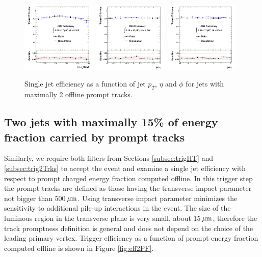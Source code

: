  
\begin{figure}[!h]
\centering
 \includegraphics[width=0.32\textwidth]{plots/trigger/effHT300_2Trk_Pt.pdf}
 \includegraphics[width=0.32\textwidth]{plots/trigger/effHT300_2Trk_Eta.pdf}
 \includegraphics[width=0.32\textwidth]{plots/trigger/effHT300_2Trk_Phi.pdf}
\caption{Single jet efficiency as a function of jet $p_T$, $\eta$ and $\phi$ for jets with maximally 2 offline prompt tracks. \label{fig:eff2Trksptetaphi}}
\end{figure}

\subsection{Two jets with maximally 15\% of energy fraction carried by prompt tracks}
\label{subsec:trig2PF}

Similarly, we require both filters from Sections \ref{subsec:trigHT} and \ref{subsec:trig2Trks} 
to accept the event and examine a single jet efficiency with respect to prompt charged energy
 fraction computed offline. In this trigger step the prompt tracks are defined
 as those having the transverse impact parameter not bigger than 500$\,\mu\text{m}$. 
Using transverse impact parameter
minimizes the sensitivity to additional pile-up interactions in the event. The size of the luminous region in 
the transverse plane is very small, about 15$\,\mu\text{m}$, therefore the track promptness definition is general
and does not depend on the choice of the leading primary vertex. 
Trigger efficiency as a function of prompt energy fraction computed offline is shown in Figure \ref{fig:eff2PF}.

